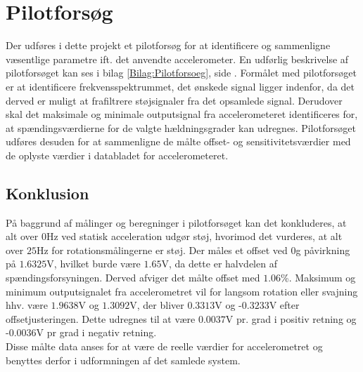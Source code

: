 \section{Pilotforsøg}\label{Sec:PilotforsoegKort}
Der udføres i dette projekt et pilotforsøg for at identificere og sammenligne væsentlige parametre ift. det anvendte accelerometer. En udførlig beskrivelse af pilotforsøget kan ses i bilag \ref{Bilag:Pilotforsoeg}, side \pageref{Bilag:Pilotforsoeg}.
Formålet med pilotforsøget er at identificere frekvensspektrummet, det ønskede signal ligger indenfor, da det derved er muligt at frafiltrere støjsignaler fra det opsamlede signal. Derudover skal det maksimale og minimale outputsignal fra accelerometeret identificeres for, at spændingsværdierne for de valgte hældningsgrader kan udregnes. Pilotforsøget udføres desuden for at sammenligne de målte offset- og sensitivitetsværdier med de oplyste værdier i databladet for accelerometeret. 

\subsection{Konklusion}
På baggrund af målinger og beregninger i pilotforsøget kan det konkluderes, at alt over $0$Hz ved statisk acceleration udgør støj, hvorimod det vurderes, at alt over $25$Hz for rotationsmålingerne er støj. Der måles et offset ved $0$g påvirkning på $1.6325$V, hvilket burde være $1.65$V, da dette er halvdelen af spændingsforsyningen. Derved afviger det målte offset med $1.06$\%. Maksimum og minimum outputsignalet fra accelerometret vil for langsom rotation eller svajning hhv. være $1.9638$V og $1.3092$V, der bliver $0.3313$V og -$0.3233$V efter offsetjusteringen. Dette udregnes til at være $0.0037$V pr. grad i positiv retning og -$0.0036$V pr grad i negativ retning. \\
Disse målte data anses for at være de reelle værdier for accelerometret og benyttes derfor i udformningen af det samlede system.

